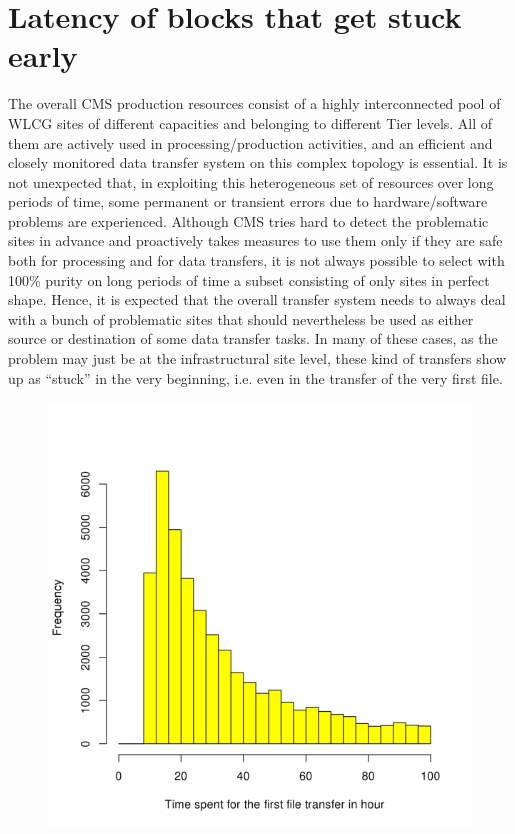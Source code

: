\section{Latency of blocks that get stuck early}

The overall CMS production resources consist of a highly
interconnected pool of WLCG sites of different capacities and
belonging to different Tier levels. All of them are actively used in
processing/production activities, and an efficient and closely
monitored data transfer system on this complex topology is
essential. It is not unexpected that, in exploiting this heterogeneous
set of resources over long periods of time, some permanent or
transient errors due to hardware/software problems are
experienced. Although CMS tries hard to detect the problematic sites
in advance and proactively takes measures to use them only if they are
safe both for processing and for data transfers, it is not always
possible to select with 100\% purity on long periods of time a subset
consisting of only sites in perfect shape. Hence, it is expected that
the overall transfer system needs to always deal with a bunch of
problematic sites that should nevertheless be used as either source or
destination of some data transfer tasks. In many of these cases, as
the problem may just be at the infrastructural site level, these kind
of transfers show up as “stuck” in the very beginning, i.e. even in
the transfer of the very first file.

\begin{figure}[htp]
\centering
\includegraphics{Figures/figure-71.pdf}
\caption{}\label{fig:figure-7.1}
\end{figure}

